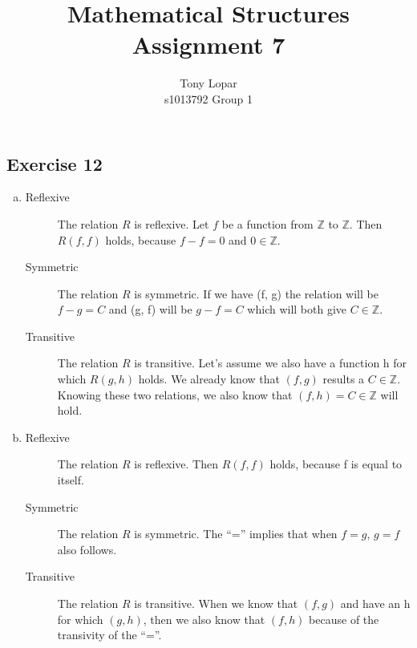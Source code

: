 \documentclass[a4paper]{article}
\title{Mathematical Structures\\Assignment 7}
\author{Tony Lopar \\ s1013792 \quad Group 1}
\newcommand{\exerciseenum}[2]{\subsection*{Exercise #1}{\begin{enumerate}[a)]#2\end{enumerate}}}
\newcommand{\ZZ}{\ensuremath{\mathbb{Z}}}
\begin{document}
\maketitle


\exerciseenum{12}{%
\addtocounter{enumi}{3}
\item%
\begin{description}
\item[Reflexive]
The relation $R$ is reflexive.
Let $f$ be a function from $\ZZ$ to $\ZZ$.
Then $R(f,f)$ holds, because $f - f = 0$ and $0 \in \ZZ$.

\item[Symmetric]
The relation $R$ is symmetric.
If we have (f, g) the relation will be $f - g = C$ and (g, f) will be $g - f = C$ which will both give $C \in \ZZ$.
\item[Transitive]
The relation $R$ is transitive.
Let's assume we also have a function h for which $R(g, h)$ holds. We already know that $(f, g)$ results a $C \in \ZZ$. Knowing these two relations, we also know that $(f, h) = C \in \ZZ$ will hold.
\end{description}
\item%
\begin{description}
\item[Reflexive]
The relation $R$ is reflexive.
Then $R(f,f)$ holds, because f is equal to itself.
\item[Symmetric]
The relation $R$ is symmetric.
The \enquote{=} implies that when $f = g$, $g = f$ also follows.
\item[Transitive]
The relation $R$ is transitive.
When we know that $(f, g)$ and have an h for which $(g, h)$, then we also know that $(f, h)$ because of the transivity of the \enquote{=}.
\end{description}
}
\end{document}
